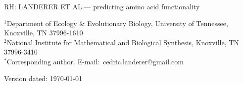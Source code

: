 \documentclass[12pt]{article}
\begin{document}
\doublespacing
\linenumbers



\noindent RH: LANDERER ET AL.--- predicting amino acid functionality
\bigskip
\medskip
\begin{center}

\bigskip


\begin{abstract}
\end{abstract}	




\end{center}

\vfill

{\small
\noindent$^{1}$Department of Ecology \& Evolutionary Biology, University of Tennessee, Knoxville, TN 37996-1610\\
\noindent$^{2}$National Institute for Mathematical and Biological Synthesis, Knoxville, TN 37996-3410\\
\noindent$^{*}$Corresponding author. E-mail:~cedric.landerer@gmail.com
}

\vfill
\centerline{Version dated: \today}
\vfill
\newpage
\end{document}
